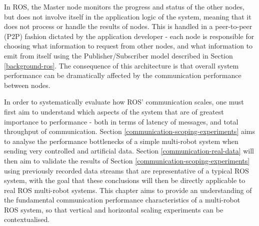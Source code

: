 \documentclass{l4proj}
\begin{document}
In ROS, the Master node monitors the progress and status of the other nodes, but does not involve itself in the application logic of the system, meaning that it does not process or handle the results of nodes. This is handled in a peer-to-peer (P2P) fashion dictated by the application developer - each node is responsible for choosing what information to request from other nodes, and what information to emit from itself using the Publisher/Subscriber model described in Section \ref{background-ros}. The consequence of this architecture is that overall system performance can be dramatically affected by the communication performance between nodes.

In order to systematically evaluate how ROS' communication scales, one must first aim to understand which aspects of the system that are of greatest importance to performance - both in terms of latency of messages, and total throughput of communication. Section \ref{communication-scoping-experiments} aims to analyse the performance bottlenecks of a simple multi-robot system when sending very controlled and artificial data. Section \ref{communication-real-data} will then aim to validate the results of Section \ref{communication-scoping-experiments} using previously recorded data streams that are representative of a typical ROS system, with the goal that these conclusions will then be directly applicable to real ROS multi-robot systems. This chapter aims to provide an understanding of the fundamental communication performance characteristics of a multi-robot ROS system, so that vertical and horizontal scaling experiments can be contextualised.
\end{document}

